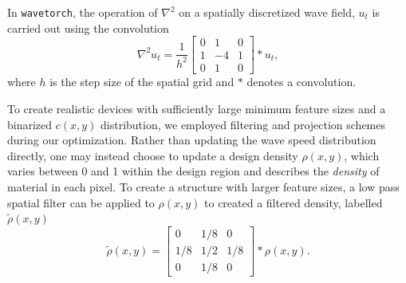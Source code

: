 

In \texttt{wavetorch}, the operation of $\nabla^2$ on a spatially discretized wave field, $u_t$ is carried out using the convolution
\begin{equation}
    \nabla^2 u_t =
    \frac{1}{h^2}
    \begin{bmatrix}
    0 &  1 & 0 \\
    1 & -4 & 1 \\
    0 &  1 & 0
    \end{bmatrix}
    *
    u_t,
    \label{eq:convolution}
\end{equation}
where $h$ is the step size of the spatial grid and $*$ denotes a convolution.

To create realistic devices with sufficiently large minimum feature sizes and a binarized $c(x,y)$ distribution, we employed filtering and projection schemes during our optimization. Rather than updating the wave speed distribution directly, one may instead choose to update a design density $\rho(x,y)$, which varies between 0 and 1 within the design region and describes the \textit{density} of material in each pixel.  To create a structure with larger feature sizes, a low pass spatial filter can be applied to $\rho(x,y)$ to created a filtered density, labelled $\tilde{\rho}(x,y)$
%
\begin{equation}
\tilde{\rho}(x,y) = 
\begin{bmatrix}
0 & 1/8 & 0 \\
1/8 & 1/2 & 1/8 \\
0 & 1/8 & 0
\end{bmatrix}
*
\rho(x,y).
\end{equation}
%

